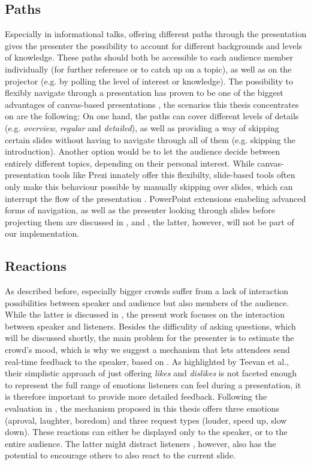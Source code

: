 \subsection{Paths}
Especially in informational talks, offering different paths through the presentation gives the presenter the possibility to account for different backgrounds and levels of knowledge. These paths should both be accessible to each audience member individually (for further reference or to catch up on a topic), as well as on the projector (e.g. by polling the level of interest or knowledge).
The possibility to flexibly navigate through a presentation has proven to be one of the biggest advantages of canvas-based presentations \cite{Lichtschlag:CanvasPresentationsInTheWild}, the scenarios this thesis concentrates on are the following: On one hand, the paths can cover different levels of details (e.g. \emph{overview}, \emph{regular} and \emph{detailed}), as well as providing a way of skipping certain slides without having to navigate through all of them (e.g. skipping the introduction). Another option would be to let the audience decide between entirely different topics, depending on their personal interest. While canvas-presentation tools like Prezi innately offer this flexibilty, slide-based tools often only make this behaviour possible by manually skipping over slides, which can interrupt the flow of the presentation \cite{Dieberger:NarrativeFlow}. PowerPoint extensions enabeling advanced forms of navigation, as well as the presenter looking through slides before projecting them are discussed in \cite{Dieberger:NarrativeFlow}, \cite{Nelson:PalettePaperInterface} and \cite{Signer:PaperPoint}, the latter, however, will not be part of our implementation.

\subsection{Reactions}
As described before, especially bigger crowds suffer from a lack of interaction possibilities between speaker and audience but also members of the audience. While the latter is discussed in \cite{Bry:Backstage}, the present work focuses on the interaction between speaker and listeners. Besides the difficulity of asking questions, which will be discussed shortly, the main problem for the presenter is to estimate the crowd's mood, which is why we suggest a mechanism that lets attendees send real-time feedback to the speaker, based on \cite{Teevan:MobileFeedbackDuringPresentation}. As highlighted by Teevan et al., their simplistic approach of just offering \emph{likes} and \emph{dislikes} is not faceted enough to represent the full range of emotions listeners can feel during a presentation, it is therefore important to provide more detailed feedback. Following the evaluation in \cite{Teevan:MobileFeedbackDuringPresentation}, the mechanism proposed in this thesis offers three emotions (aproval, laughter, boredom) and three request types (louder, speed up, slow down).
These reactions can either be displayed only to the speaker, or to the entire audience. The latter might distract listeners \cite{Teevan:MobileFeedbackDuringPresentation}, however, also has the potential to encourage others to also react to the current slide.

